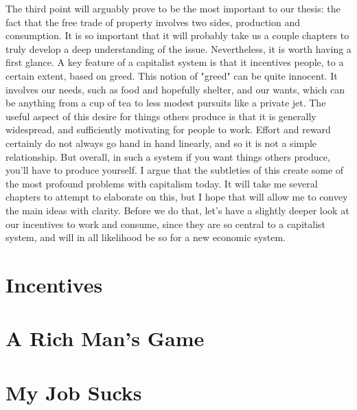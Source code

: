 \documentclass[12pt]{memoir}
\begin{document}
			The third point will arguably prove to be the most important to our thesis: the fact that the free trade of property involves two sides, production and consumption. It is so important that it will probably 
			take us a couple chapters to truly develop a deep understanding of the issue. Nevertheless, it is worth having a first glance. A key feature of a capitalist system is that it incentives people, to a certain 
			extent, based on greed. This notion of "greed" can be quite innocent. It involves our needs, such as food and hopefully shelter, and our wants, which can be anything from a cup of tea to less modest pursuits 
			like a private jet. The useful aspect of this desire for things others produce is that it is generally widespread, and sufficiently motivating for people to work. Effort and reward certainly do not always go 
			hand in hand linearly, and so it is not a simple relationship. But overall, in such a system if you want things others produce, you'll have to produce yourself. I argue that the subtleties of this create some of 
			the most profound problems with capitalism today. It will take me several chapters to attempt to elaborate on this, but I hope that will allow me to convey the main ideas with clarity. Before we do that, let's 
			have a slightly deeper look at our incentives to work and consume, since they are so central to a capitalist system, and will in all likelihood be so for a new economic system.
		
		\section{Incentives}
			
			
		
		 \section{A Rich Man's Game}
		 
		\section{My Job Sucks}
		
\end{document}
